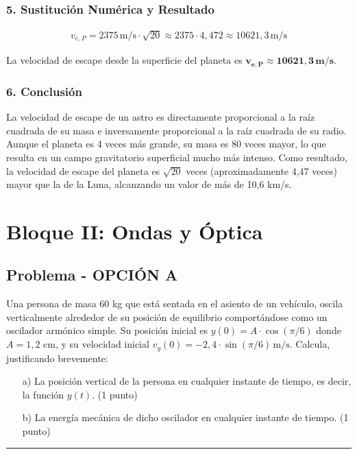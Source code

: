 \subsubsection*{5. Sustitución Numérica y Resultado}
\begin{gather}
    v_{e,P} = 2375\,\text{m/s} \cdot \sqrt{20} \approx 2375 \cdot 4,472 \approx 10621,3\,\text{m/s}
\end{gather}
\begin{cajaresultado}
    La velocidad de escape desde la superficie del planeta es $\boldsymbol{v_{e,P} \approx 10621,3\,\textbf{m/s}}$.
\end{cajaresultado}

\subsubsection*{6. Conclusión}
\begin{cajaconclusion}
La velocidad de escape de un astro es directamente proporcional a la raíz cuadrada de su masa e inversamente proporcional a la raíz cuadrada de su radio. Aunque el planeta es 4 veces más grande, su masa es 80 veces mayor, lo que resulta en un campo gravitatorio superficial mucho más intenso. Como resultado, la velocidad de escape del planeta es $\sqrt{20}$ veces (aproximadamente 4,47 veces) mayor que la de la Luna, alcanzando un valor de más de 10,6 km/s.
\end{cajaconclusion}

\newpage
\section{Bloque II: Ondas y Óptica}
\label{sec:ondas_2012_sep}

\subsection{Problema - OPCIÓN A}
\label{subsec:IIA_2012_sep}

\begin{cajaenunciado}
Una persona de masa 60 kg que está sentada en el asiento de un vehículo, oscila verticalmente alrededor de su posición de equilibrio comportándose como un oscilador armónico simple. Su posición inicial es $y(0)=A\cdot\cos(\pi/6)$ donde $A=1,2$ cm, y su velocidad inicial $v_y(0)=-2,4\cdot\sin(\pi/6)\,\text{m/s}$. Calcula, justificando brevemente:
\begin{enumerate}
    \item[a)] La posición vertical de la persona en cualquier instante de tiempo, es decir, la función $y(t)$. (1 punto)
    \item[b)] La energía mecánica de dicho oscilador en cualquier instante de tiempo. (1 punto)
\end{enumerate}
\end{cajaenunciado}
\hrule

